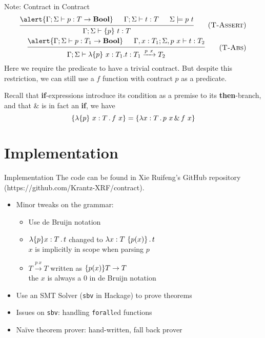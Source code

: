 \documentclass[handout]{beamer}
\begin{document}
\begin{frame}{Note: Contract in Contract}
    \begin{align*}
        {\begin{prooftree}
            \hypo{ \alert{\Gamma;\Sigma \vdash p : T \to \textbf{Bool}} }
            \hypo{ \Gamma;\Sigma \vdash t : T }
            \hypo{ \Sigma \models p \ t }
            \infer3{ \Gamma;\Sigma \vdash \qty{p} \ t : T }
        \end{prooftree}} \tag{\textsc{T-Assert}} \\
        {\begin{prooftree}
            \hypo{ \alert{\Gamma;\Sigma \vdash p : T_1 \to \textbf{Bool}} }
            \hypo{ \Gamma, x:T_1;\Sigma,p \ x \vdash t : T_2 }
            \infer2{ \Gamma;\Sigma \vdash \lambda \qty{p} \ x : T_1 . t : T_1 \xrightarrow{p \ x} T_2 }
        \end{prooftree}} \tag{\textsc{T-Abs}}
    \end{align*}
    Here we require the predicate to have a trivial contract. But despite this restriction, we can still use a $f$ function with contract $p$ as a predicate. \pause

    Recall that \textbf{if}-expressions introduce its condition as a premise to its \textbf{then}-branch, and that $\&$ is in fact an \textbf{if}, we have
    \[
        \qty{\lambda \qty{p} \ x : T \operatorname. f \ x}
        = \qty{\lambda x : T \operatorname. p \ x \operatorname{\&} f \ x}
    \]
\end{frame}

\section{Implementation}

\begin{frame}{Implementation}
    The code can be found in Xie Ruifeng's GitHub repository (https://github.com/Krantz-XRF/contract).
    \begin{itemize}
        \item Minor tweaks on the grammar:
        \begin{itemize}
            \item Use de Bruijn notation
            \item \alert{$\lambda \qty{p} x : T \operatorname. t$} changed to \alert{$\lambda x : T \ \qty{p(x)} \operatorname. t$} \\
            $x$ is implicitly in scope when parsing $p$
            \item \alert{$T \xrightarrow{p \ x} T$} written as \alert{$\qty{p(x)} T \to T$} \\
            the $x$ is always a $0$ in de Bruijn notation
        \end{itemize}
        \item Use an SMT Solver (\texttt{sbv} in Hackage) to prove theorems
        \item Issues on \texttt{sbv}: handling \texttt{forall}ed functions
        \item Na\"ive theorem prover: hand-written, fall back prover
    \end{itemize}
\end{frame}
\end{document}
